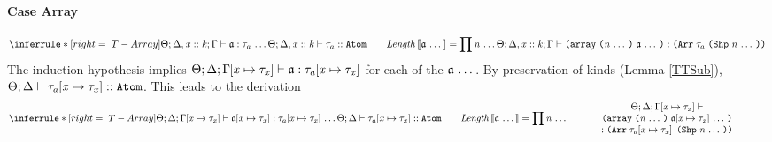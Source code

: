 \begin{sproof}
  \paragraph{Case {\sc Array}}
  \[{\infr[T-Array]
    {\sequence{\typeof{\sEnv}{\kEnv, \haskind{\var}{\kind}}{\tEnv}
        {\atom}{\type_a}}
      \\\\
      \kindof{\sEnv}{\kEnv, \haskind{\var}{\kind}}{\type_a}{\kindatom}
      \qquad
      \mathit{Length}\llb \sequence{\atom} \rrb = \prod{\sequence{\nat}}}
    {\typeof{\sEnv}{\kEnv, \haskind{\var}{\kind}}{\tEnv}
      {\arrlit{\sequence{\atom}}{\sequence{\nat}}}
      {\typearray{\type_a}{\idxshape{\sequence{\nat}}}}}}\]
  The induction hypothesis implies
  $\Theta;\Delta;\Gamma\hspace{-2pt}\left[ \mathit{x} \mapsto \mathit{\tau}_{\mathit{x}} \right] \vdash \mathfrak{a} : \mathit{\tau}_a\hspace{-2pt}\left[ \mathit{x} \mapsto \mathit{\tau}_{\mathit{x}} \right]$
  for each of the $\mathfrak{a} \, \ldots \,$.
  By preservation of kinds (Lemma \ref{TTSub}),
  $\Theta;\Delta \vdash \mathit{\tau}_a\hspace{-2pt}\left[ \mathit{x} \mapsto \mathit{\tau}_{\mathit{x}} \right] :: \text{\tt Atom}$.
  This leads to the derivation
  \[{\infr[T-Array]
    {\sequence{\typeof{\sEnv}{\kEnv}{\typesubst{\tEnv}}
        {\typesubst{\atom}}{\typesubst{\type_a}}}
      \\\\
      \kindof{\sEnv}{\kEnv}{\typesubst{\type_a}}{\kindatom}
      \qquad
      \mathit{Length}\llb \sequence{\atom} \rrb = \prod{\sequence{\nat}}}
    {\parbox{0.6\textwidth}
      {\centering
        \({\sEnv};{\kEnv};{\typesubst{\tEnv}}\vdash\)
        \({\arrlit{\sequence{\typesubst{\atom}}}{\sequence{\nat}}}\)
        \(:{\typearray{\typesubst{\type_a}}{\idxshape{\sequence{\nat}}}}\)}}}\]

\end{sproof}
